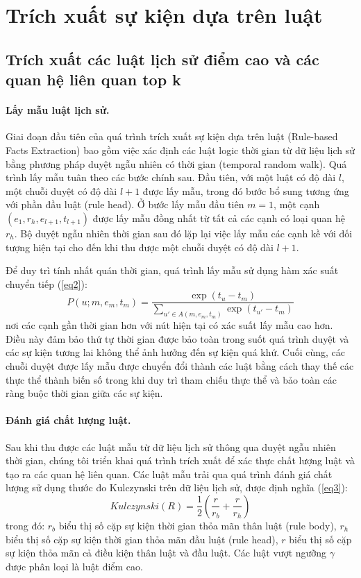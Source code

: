 \section{Trích xuất sự kiện dựa trên luật}

\subsection{Trích xuất các luật lịch sử điểm cao và các quan hệ liên quan top k}

\paragraph{Lấy mẫu luật lịch sử.}
Giai đoạn đầu tiên của quá trình trích xuất sự kiện dựa trên luật (Rule-based Facts Extraction) bao gồm việc xác định các luật logic thời gian từ dữ liệu lịch sử bằng phương pháp duyệt ngẫu nhiên có thời gian (temporal random walk). Quá trình lấy mẫu tuân theo các bước chính sau. Đầu tiên, với một luật có độ dài \( l \), một chuỗi duyệt có độ dài \( l+1 \) được lấy mẫu, trong đó bước bổ sung tương ứng với phần đầu luật (rule head). Ở bước lấy mẫu đầu tiên \( m = 1 \), một cạnh \( (e_1, r_h, e_{l+1}, t_{l+1}) \) được lấy mẫu đồng nhất từ tất cả các cạnh có loại quan hệ \( r_h \). Bộ duyệt ngẫu nhiên thời gian sau đó lặp lại việc lấy mẫu các cạnh kề với đối tượng hiện tại cho đến khi thu được một chuỗi duyệt có độ dài \( l+1 \).

Để duy trì tính nhất quán thời gian, quá trình lấy mẫu sử dụng hàm xác suất chuyển tiếp (\ref{eq2}):
\begin{equation}
    \label{eq2}
    P(u; m, e_m, t_m) = \frac{\exp(t_u - t_m)}{\sum_{u' \in A(m, e_m, t_m)} \exp(t_{u'} - t_m)}
\end{equation}
nơi các cạnh gần thời gian hơn với nút hiện tại có xác suất lấy mẫu cao hơn. Điều này đảm bảo thứ tự thời gian được bảo toàn trong suốt quá trình duyệt và các sự kiện tương lai không thể ảnh hưởng đến sự kiện quá khứ. Cuối cùng, các chuỗi duyệt được lấy mẫu được chuyển đổi thành các luật bằng cách thay thế các thực thể thành biến số trong khi duy trì tham chiếu thực thể và bảo toàn các ràng buộc thời gian giữa các sự kiện.

\paragraph{Đánh giá chất lượng luật.}
Sau khi thu được các luật mẫu từ dữ liệu lịch sử thông qua duyệt ngẫu nhiên thời gian, chúng tôi triển khai quá trình trích xuất để xác thực chất lượng luật và tạo ra các quan hệ liên quan. Các luật mẫu trải qua quá trình đánh giá chất lượng sử dụng thước đo Kulczynski \cite{ref_article16} trên dữ liệu lịch sử, được định nghĩa (\ref{eq3}):
\begin{equation}
\label{eq3}
    Kulczynski(R) = \frac{1}{2} \left( \frac{r}{r_b} + \frac{r}{r_h} \right)
\end{equation}
trong đó: \( r_b \) biểu thị số cặp sự kiện thời gian thỏa mãn thân luật (rule body), \( r_h \) biểu thị số cặp sự kiện thời gian thỏa mãn đầu luật (rule head), \( r \) biểu thị số cặp sự kiện thỏa mãn cả điều kiện thân luật và đầu luật. Các luật vượt ngưỡng \( \gamma \) được phân loại là luật điểm cao.

